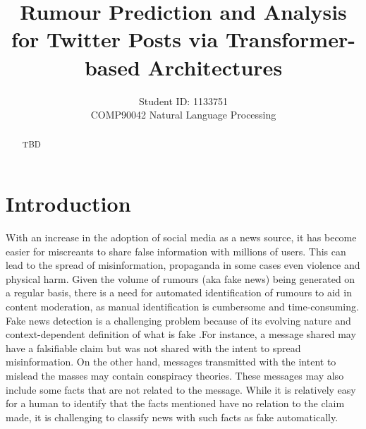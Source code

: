 \documentclass[11pt,a4paper]{article}
\title{Rumour Prediction and Analysis for Twitter Posts via Transformer-based Architectures}
\author{ Student ID: 1133751 \\
 COMP90042 Natural Language Processing \\
}
\date{}
\begin{document}
\maketitle
\begin{abstract}
TBD
\end{abstract}

\section{Introduction}
With an increase in the adoption of social media as a news source, it has become easier for miscreants to share false information with millions of users. This can lead to the spread of misinformation, propaganda in some cases even violence and physical harm. 
Given the volume of rumours (aka fake news) being generated on a regular basis, there is a need for automated identification of rumours to aid in content moderation, as manual identification is cumbersome and time-consuming.
\newline
Fake news detection is a challenging problem because of its evolving nature and context-dependent definition of what is fake \citep{RN675}.For instance, a message shared may have a falsifiable claim but was not shared with the intent to spread misinformation. 
On the other hand, messages transmitted with the intent to mislead the masses may contain conspiracy theories. These messages may also include some facts that are not related to the message. While it is relatively easy for a human to identify that the facts mentioned have no relation to the claim made, it is challenging to classify news with such facts as fake automatically.
\end{document}
